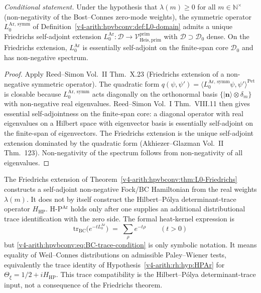 \begin{theorem}
\label{v4-arith:hpvbconv:thm:L0-Friedrichs}
\emph{Conditional statement.} Under the hypothesis that \(\lambda(m)\geq 0\)
for all \(m\in\mathbb{N}^{\times}\) (non-negativity of the Bost--Connes
zero-mode weights), the symmetric operator
\(L_{0}^{\mathrm{Ar},\,\mathrm{symm}}\) of
Definition~\ref{v4-arith:hpvbconv:def:L0-domain} admits a unique Friedrichs
self-adjoint extension
\(L_{0}^{\mathrm{Ar}}:\mathcal{D}\to\mathcal{V}^{\mathrm{prim}}_{\mathrm{Heis},\mathrm{prim}}\)
with \(\mathcal{D}\supset\mathcal{D}_{0}\) dense. On the Friedrichs
extension, \(L_{0}^{\mathrm{Ar}}\) is essentially self-adjoint on the
finite-span core \(\mathcal{D}_{0}\) and has non-negative spectrum.
\end{theorem}

\begin{proof}
Apply Reed--Simon Vol.~II Thm.~X.23 (Friedrichs extension of a
non-negative symmetric operator). The quadratic form
\(q(\psi,\psi')=\langle L_{0}^{\mathrm{Ar},\,\mathrm{symm}}\psi,\psi'\rangle^{\mathrm{Pet}}\)
is closable because \(L_{0}^{\mathrm{Ar},\,\mathrm{symm}}\) acts
diagonally on the orthonormal basis
\(\{|\mathbf{n}\rangle\otimes\delta_{m}\}\) with non-negative real
eigenvalues. Reed--Simon Vol.~I Thm.~VIII.11 then gives essential
self-adjointness on the finite-span core: a diagonal operator with
real eigenvalues on a Hilbert space with eigenvector basis is
essentially self-adjoint on the finite-span of eigenvectors. The
Friedrichs extension is the unique self-adjoint extension dominated
by the quadratic form (Akhiezer--Glazman Vol.~II Thm.~123). Non-negativity
of the spectrum follows from non-negativity of all eigenvalues.
\end{proof}

\begin{proposition}
\label{v4-arith:hpvbconv:prop:BC-trace-compatibility}
The Friedrichs extension of
Theorem~\ref{v4-arith:hpvbconv:thm:L0-Friedrichs} constructs a
self-adjoint non-negative Fock/BC Hamiltonian from the real weights
\(\lambda(m)\). It does not by itself construct the Hilbert--P\'olya
determinant-trace operator \(H_{\mathrm{HP}}\). H-P\(^{\mathrm{Ar}}\) holds only
after one supplies an additional distributional trace identification
with the zero side. The formal heat-kernel expression is
\begin{equation}
\label{v4-arith:hpvbconv:eq:BC-trace-condition}
\mathrm{tr}_{\mathrm{BC}}\bigl(e^{-tL_{0}^{\mathrm{Ar}}}\bigr)\;=\;\sum_{\rho}e^{-t\rho}
\qquad(t>0)
\end{equation}
but \eqref{v4-arith:hpvbconv:eq:BC-trace-condition} is only symbolic
notation. It means equality of Weil--Connes
distributions on admissible Paley--Wiener tests, equivalently the
trace identity of Hypothesis~\ref{v4-arith:rh:hyp:HPAr} for
\(\Theta_{\xi}=1/2+iH_{\mathrm{HP}}\). This trace compatibility is
the Hilbert--P\'olya determinant-trace input, not a consequence of the
Friedrichs theorem.
\end{proposition}


